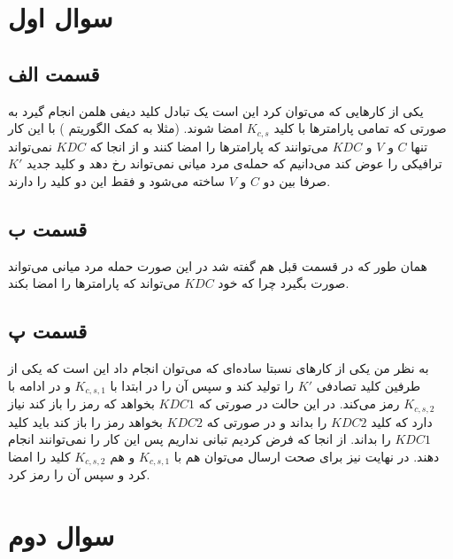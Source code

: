 \documentclass[]{article}
\begin{document}
\printheader

\section*{سوال اول}
\subsection*{قسمت الف}
یکی از کار‌هایی که می‌توان کرد این است یک تبادل کلید دیفی هلمن انجام گیرد به صورتی که تمامی
پارامتر‌ها با کلید
$K_{c,s}$
امضا شوند. (مثلا به کمک الگوریتم ) با این کار تنها
$C$ و $V$
و
$KDC$
می‌توانند که پارامتر‌ها را امضا کنند و از انجا که
$KDC$
نمی‌تواند ترافیکی را عوض کند می‌دانیم که حمله‌ی مرد میانی نمی‌تواند رخ دهد و کلید جدید
$K'$
صرفا بین دو
$C$ و $V$
ساخته می‌شود و فقط این دو کلید را دارند.
\subsection*{قسمت ب}
همان طور که در قسمت قبل هم گفته شد در این صورت حمله مرد میانی می‌تواند صورت بگیرد چرا که خود
$KDC$
می‌تواند که پارامتر‌ها را امضا بکند.
\subsection*{قسمت پ}
به نظر من یکی از کار‌های نسبتا ساده‌ای که می‌توان انجام داد این است که یکی از طرفین کلید تصادفی
$K'$
را تولید کند و سپس آن را در ابتدا با
$K_{c,s,1}$ و در ادامه با $K_{c,s,2}$
رمز می‌کند. در این حالت در صورتی که
$KDC1$
بخواهد که رمز را باز کند نیاز دارد که کلید
$KDC2$
را بداند و در صورتی که
$KDC2$
بخواهد رمز را باز کند باید کلید
$KDC1$
را بداند. از انجا که فرض کردیم تبانی نداریم پس این کار را نمی‌توانند انجام دهند.
در نهایت نیز برای صحت ارسال می‌توان هم با
$K_{c,s,1}$ و هم $K_{c,s,2}$
کلید را امضا کرد و سپس آن را رمز کرد.
\section*{سوال دوم}
\end{document}
